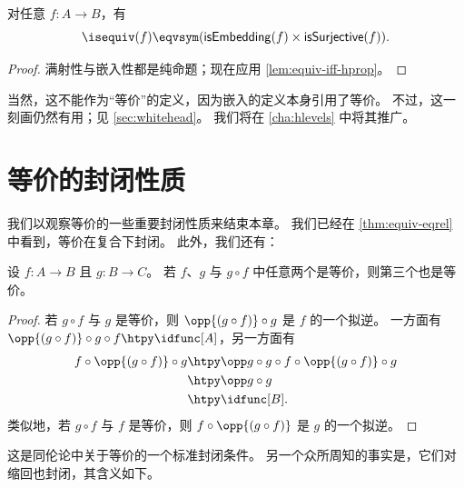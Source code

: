 \begin{cor}
  对任意 $f:A\to B$，有
  \[ \isequiv(f) \eqvsym (\mathsf{isEmbedding}(f) \times \mathsf{isSurjective}(f)).\]
\end{cor}
\begin{proof}
  满射性与嵌入性都是纯命题；现在应用 \cref{lem:equiv-iff-hprop}。
\end{proof}

当然，这不能作为“等价”的定义，因为嵌入的定义本身引用了等价。
不过，这一刻画仍然有用；见 \cref{sec:whitehead}。
我们将在 \cref{cha:hlevels} 中将其推广。


\section{等价的封闭性质}
\label{sec:equiv-closures}
\label{sec:fiberwise-equivalences}
%


我们以观察等价的一些重要封闭性质来结束本章。
我们已经在 \cref{thm:equiv-eqrel} 中看到，等价在复合下封闭。
此外，我们还有：

\begin{thm}[2-out-of-3 性质]\label{thm:two-out-of-three}
  设 $f:A\to B$ 且 $g:B\to C$。
  若 $f$、$g$ 与 $g\circ f$ 中任意两个是等价，则第三个也是等价。
\end{thm}
\begin{proof}
  若 $g\circ f$ 与 $g$ 是等价，则 $\opp{(g\circ f)} \circ g$ 是 $f$ 的一个拟逆。
  一方面有 $\opp{(g\circ f)} \circ g \circ f \htpy \idfunc[A]$，另一方面有
  \begin{align*}
    f \circ \opp{(g\circ f)} \circ g
    &\htpy \opp g \circ g \circ f \circ \opp{(g\circ f)} \circ g\\
    &\htpy \opp g \circ g\\
    &\htpy \idfunc[B].
  \end{align*}
  类似地，若 $g\circ f$ 与 $f$ 是等价，则 $f\circ \opp{(g\circ f)}$ 是 $g$ 的一个拟逆。
\end{proof}

这是同伦论中关于等价的一个标准封闭条件。
另一个众所周知的事实是，它们对缩回也封闭，其含义如下。

%

